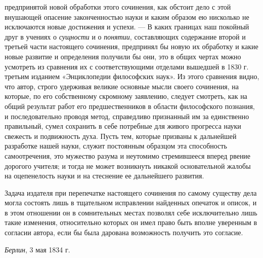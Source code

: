 предпринятой новой обработки этого сочинения, как обстоит дело с этой
внушающей опасение законченностью науки и каким образом ею нисколько не
исключаются новые достижения и успехи. — В каких границах наш покойный друг в
учениях о {\em сущности} и о
{\em понятии}, составляющих содержание второй и третьей
части настоящего сочинения, предпринял бы новую их обработку и какие новые
развитие и определения получили бы они, это в общих чертах можно усмотреть
из сравнения их с соответствующими отделами вышедшей в 1830 г. третьим
изданием «Энциклопедии философских наук». Из этого сравнения видно, что
автор, строго удерживая великие основные мысли своего сочинения, на
которые, по его собственному скромному заявлению, следует смотреть, как на
общий результат работ его предшественников в области философского познания,
и последовательно проводя метод, справедливо признанный им за единственно
правильный, сумел сохранить в себе потребные для живого прогресса науки
свежесть и подвижность духа. Пусть тем, которые призваны к дальнейшей
разработке нашей науки, служит постоянным образцом эта способность
самоотречения, это мужество разума и неутомимо стремившееся вперед рвение
дорогого учителя; и тогда не может возникнуть никакой основательной жалобы
на оцепенелость науки и на стеснение ее дальнейшего развития.

Задача издателя при перепечатке настоящего сочинения по самому существу дела
могла состоять лишь в тщательном исправлении найденных опечаток и описок, и
в этом отношении он в сомнительных местах позволял себе исключительно лишь
такие изменения, относительно которых он имел право быть вполне уверенным в
согласии автора, если бы была дарована возможность получить это согласие.

{\em Берлин}, 3 мая 1834 г.
